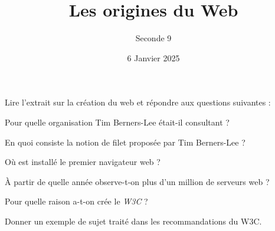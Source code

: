 \documentclass{article}
\title{Les origines du Web}
\author{Seconde 9}
\date{6 Janvier 2025}
\begin{document}
\maketitle

\begin{tcolorbox}
\begin{center}
Lire l'extrait sur la création du web et répondre aux questions suivantes :
\end{center}
\end{tcolorbox}
\begin{enumquestions}
\item Pour quelle organisation Tim Berners-Lee était-il consultant ?
\item En quoi consiste la notion de \og filet \fg proposée par Tim Berners-Lee ?
\item Où est installé le premier navigateur web ?
\item À partir de quelle année observe-t-on plus d'un million de serveurs web ?
\item Pour quelle raison a-t-on crée le \emph{W3C} ?
\item Donner un exemple de sujet traité dans les recommandations du W3C.
\end{enumquestions}
\end{document}
